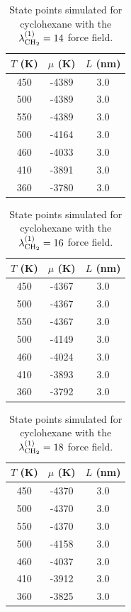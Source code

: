 \documentclass[journal=jctc,manuscript=article]{achemso}
\begin{document}
\begin{table}[htb!]
	\caption{State points simulated for cyclohexane with the $\lambda^{(1)}_{\rm CH_2} = 14$ force field.}
	\begin{center}
		\begin{tabular}{|c|c|c|}
			\hline
			$T$ (K) & $\mu$ (K) & $L$ (nm) \\ \hline
			450	&	-4389	&	3.0	\\
			500	&	-4389	&	3.0	\\
			550	&	-4389	&	3.0	\\
			500	&	-4164	&	3.0	\\
			460	&	-4033	&	3.0	\\
			410	&	-3891	&	3.0	\\
			360	&	-3780	&	3.0	\\
			\hline
		\end{tabular}
	\end{center}
\end{table}

\begin{table}[htb!]
	\caption{State points simulated for cyclohexane with the $\lambda^{(1)}_{\rm CH_2} = 16$ force field.}
	\begin{center}
		\begin{tabular}{|c|c|c|}
			\hline
			$T$ (K) & $\mu$ (K) & $L$ (nm) \\ \hline
			450	&	-4367	&	3.0	\\
			500	&	-4367	&	3.0	\\
			550	&	-4367	&	3.0	\\
			500	&	-4149	&	3.0	\\
			460	&	-4024	&	3.0	\\
			410	&	-3893	&	3.0	\\
			360	&	-3792	&	3.0	\\
			\hline
		\end{tabular}
	\end{center}
\end{table}

\begin{table}[htb!]
	\caption{State points simulated for cyclohexane with the $\lambda^{(1)}_{\rm CH_2} = 18$ force field.}
	\begin{center}
		\begin{tabular}{|c|c|c|}
			\hline
			$T$ (K) & $\mu$ (K) & $L$ (nm) \\ \hline
			450	&	-4370	&	3.0	\\
			500	&	-4370	&	3.0	\\
			550	&	-4370	&	3.0	\\
			500	&	-4158	&	3.0	\\
			460	&	-4037	&	3.0	\\
			410	&	-3912	&	3.0	\\
			360	&	-3825	&	3.0	\\
			\hline
		\end{tabular}
	\end{center}
\end{table}
\end{document}
